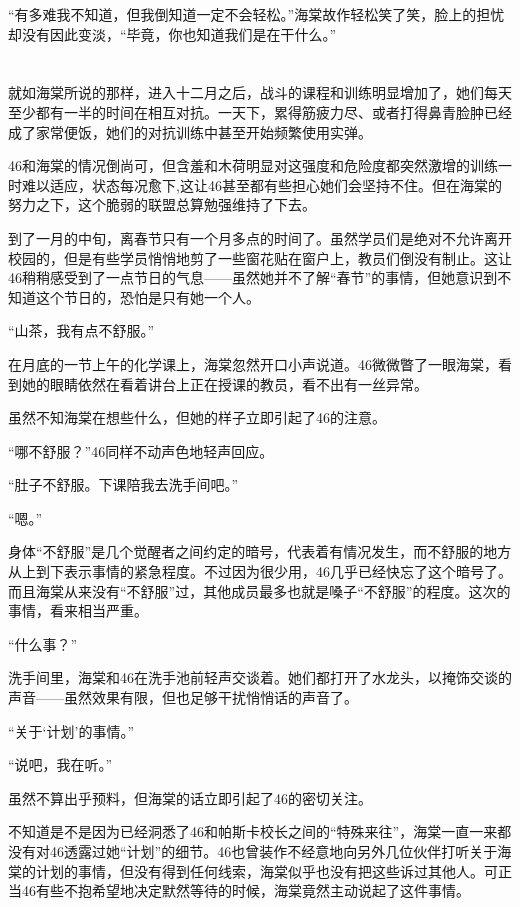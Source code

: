 “有多难我不知道，但我倒知道一定不会轻松。”海棠故作轻松笑了笑，脸上的担忧却没有因此变淡，“毕竟，你也知道我们是在干什么。”

\section*{}

就如海棠所说的那样，进入十二月之后，战斗的课程和训练明显增加了，她们每天至少都有一半的时间在相互对抗。一天下，累得筋疲力尽、或者打得鼻青脸肿已经成了家常便饭，她们的对抗训练中甚至开始频繁使用实弹。

46和海棠的情况倒尚可，但含羞和木荷明显对这强度和危险度都突然激增的训练一时难以适应，状态每况愈下,这让46甚至都有些担心她们会坚持不住。但在海棠的努力之下，这个脆弱的联盟总算勉强维持了下去。

到了一月的中旬，离春节只有一个月多点的时间了。虽然学员们是绝对不允许离开校园的，但是有些学员悄悄地剪了一些窗花贴在窗户上，教员们倒没有制止。这让46稍稍感受到了一点节日的气息——虽然她并不了解“春节”的事情，但她意识到不知道这个节日的，恐怕是只有她一个人。

“山茶，我有点不舒服。”

在月底的一节上午的化学课上，海棠忽然开口小声说道。46微微瞥了一眼海棠，看到她的眼睛依然在看着讲台上正在授课的教员，看不出有一丝异常。

虽然不知海棠在想些什么，但她的样子立即引起了46的注意。

“哪不舒服？”46同样不动声色地轻声回应。

“肚子不舒服。下课陪我去洗手间吧。”

“嗯。”

身体“不舒服”是几个觉醒者之间约定的暗号，代表着有情况发生，而不舒服的地方从上到下表示事情的紧急程度。不过因为很少用，46几乎已经快忘了这个暗号了。而且海棠从来没有“不舒服”过，其他成员最多也就是嗓子“不舒服”的程度。这次的事情，看来相当严重。

“什么事？”

洗手间里，海棠和46在洗手池前轻声交谈着。她们都打开了水龙头，以掩饰交谈的声音——虽然效果有限，但也足够干扰悄悄话的声音了。

“关于‘计划’的事情。”

“说吧，我在听。”

虽然不算出乎预料，但海棠的话立即引起了46的密切关注。

不知道是不是因为已经洞悉了46和帕斯卡校长之间的“特殊来往”，海棠一直一来都没有对46透露过她“计划”的细节。46也曾装作不经意地向另外几位伙伴打听关于海棠的计划的事情，但没有得到任何线索，海棠似乎也没有把这些诉过其他人。可正当46有些不抱希望地决定默然等待的时候，海棠竟然主动说起了这件事情。

